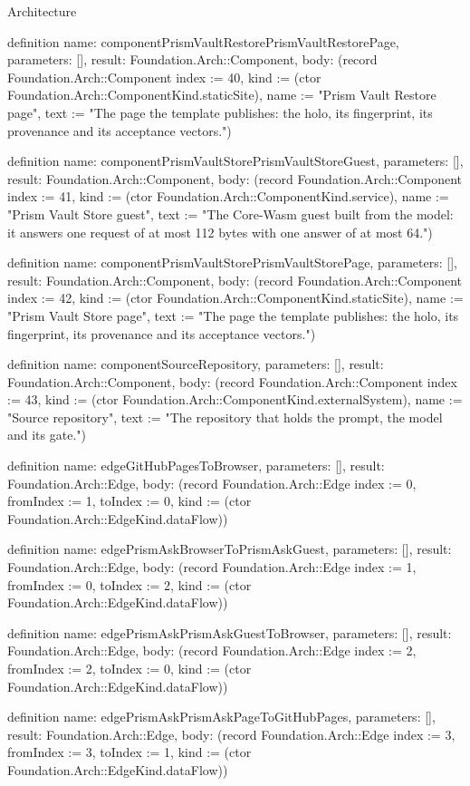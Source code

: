 \begin{lexlean}{Architecture}
\begin{semanticmodule}
definition{
  name: componentPrismVaultRestorePrismVaultRestorePage,
  parameters: [],
  result: Foundation.Arch::Component,
  body: (record Foundation.Arch::Component {index := 40, kind := (ctor Foundation.Arch::ComponentKind.staticSite), name := "Prism Vault Restore page", text := "The page the template publishes: the holo, its fingerprint, its provenance and its acceptance vectors."})
}

definition{
  name: componentPrismVaultStorePrismVaultStoreGuest,
  parameters: [],
  result: Foundation.Arch::Component,
  body: (record Foundation.Arch::Component {index := 41, kind := (ctor Foundation.Arch::ComponentKind.service), name := "Prism Vault Store guest", text := "The Core-Wasm guest built from the model: it answers one request of at most 112 bytes with one answer of at most 64."})
}

definition{
  name: componentPrismVaultStorePrismVaultStorePage,
  parameters: [],
  result: Foundation.Arch::Component,
  body: (record Foundation.Arch::Component {index := 42, kind := (ctor Foundation.Arch::ComponentKind.staticSite), name := "Prism Vault Store page", text := "The page the template publishes: the holo, its fingerprint, its provenance and its acceptance vectors."})
}

definition{
  name: componentSourceRepository,
  parameters: [],
  result: Foundation.Arch::Component,
  body: (record Foundation.Arch::Component {index := 43, kind := (ctor Foundation.Arch::ComponentKind.externalSystem), name := "Source repository", text := "The repository that holds the prompt, the model and its gate."})
}

definition{
  name: edgeGitHubPagesToBrowser,
  parameters: [],
  result: Foundation.Arch::Edge,
  body: (record Foundation.Arch::Edge {index := 0, fromIndex := 1, toIndex := 0, kind := (ctor Foundation.Arch::EdgeKind.dataFlow)})
}

definition{
  name: edgePrismAskBrowserToPrismAskGuest,
  parameters: [],
  result: Foundation.Arch::Edge,
  body: (record Foundation.Arch::Edge {index := 1, fromIndex := 0, toIndex := 2, kind := (ctor Foundation.Arch::EdgeKind.dataFlow)})
}

definition{
  name: edgePrismAskPrismAskGuestToBrowser,
  parameters: [],
  result: Foundation.Arch::Edge,
  body: (record Foundation.Arch::Edge {index := 2, fromIndex := 2, toIndex := 0, kind := (ctor Foundation.Arch::EdgeKind.dataFlow)})
}

definition{
  name: edgePrismAskPrismAskPageToGitHubPages,
  parameters: [],
  result: Foundation.Arch::Edge,
  body: (record Foundation.Arch::Edge {index := 3, fromIndex := 3, toIndex := 1, kind := (ctor Foundation.Arch::EdgeKind.dataFlow)})
}


\end{semanticmodule}
\end{lexlean}
